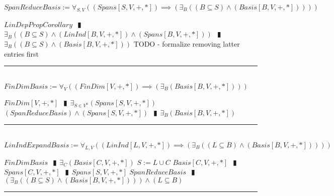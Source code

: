 \documentclass{book}
\newcommand{\abr}{:=}
\newcommand{\pipe}{$\phantom{(}\vrectangleblack\phantom{)}$}
\begin{document}
$SpanReduceBasis \abr \forall_{S, V}((Spans[S, V, +, *]) \implies (\exists_{B}((B \subseteq S) \land (Basis[B, V, +, *]))))$
\begin{enumerate}
  \lit $LinDepPropCorollary$ \pipe $\exists_{B}((B \subseteq S) \land (LinInd[B, V, +, *]) \land (Spans[B, V, +, *]))$ \pipe $\exists_{B}((B \subseteq S) \land (Basis[B, V, +, *]))$
  \lit TODO - formalize removing latter entries first 
\end{enumerate} \vspace{.75mm} \hrule \vspace{.75mm} \ \\ 

$FinDimBasis \abr \forall_{V}((FinDim[V, +, *]) \implies (\exists_{B}(Basis[B, V, +, *])))$
\begin{enumerate}
  \lit $FinDim[V, +, *]$ \pipe $\exists_{S \in V^n}(Spans[S, V, +, *])$
  \lit $(SpanReduceBasis) \land (Spans[S, V, +, *])$ \pipe $\exists_{B}(Basis[B, V, +, *])$
\end{enumerate} \vspace{.75mm} \hrule \vspace{.75mm} \ \\ 

$LinIndExpandBasis \abr \forall_{L, V}((LinInd[L, V, +, *]) \implies (\exists_{B}((L \subseteq B) \land (Basis[B, V, +, *]))))$
\begin{enumerate}
  \lit $FinDimBasis$ \pipe $\exists_{C}(Basis[C, V, +, *])$
  \lit $S \abr L \cup C$
  \lit $Basis[C, V, +, *]$ \pipe $Spans[C, V, +, *]$ \pipe $Spans[S, V, +, *]$
  \lit $SpanReduceBasis$ \pipe $(\exists_{B}((B \subseteq S) \land (Basis[B, V, +, *]))) \land (L \subseteq B)$ 
\end{enumerate} \vspace{.75mm} \hrule \vspace{.75mm} \ \\ 
\end{document}
